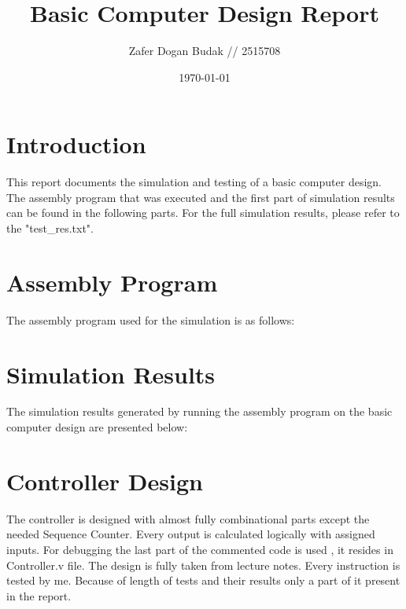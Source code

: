 \documentclass[12pt,a4paper]{article}
\title{Basic Computer Design Report}
\author{Zafer Dogan Budak // 2515708}
\date{\today}
\begin{document}
\maketitle

\tableofcontents

\newpage

\section{Introduction}
This report documents the simulation and testing of a basic computer design. The assembly program that was executed and the first part of simulation results can be found in the following parts. For the full simulation results, please refer to the "test\_res.txt".

\section{Assembly Program}
The assembly program used for the simulation is as follows:



\section{Simulation Results}
The simulation results generated by running the assembly program on the basic computer design are presented below:




\section{Controller Design}
The controller is designed with almost fully combinational parts except the needed Sequence Counter. Every output is calculated logically with assigned inputs. For debugging the last part of the commented code is used , it resides in Controller.v file. The design is fully taken from lecture notes. Every instruction is tested by me. Because of length of tests and their results only a part of it present in the report. 
\end{document}
